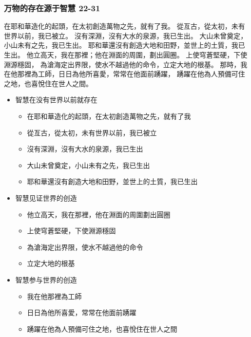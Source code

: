 \subsubsection{万物的存在源于智慧 22-31}
在耶和華造化的起頭，在太初創造萬物之先，就有了我。
從亙古，從太初，未有世界以前，我已被立。
沒有深淵，沒有大水的泉源，我已生出。
大山未曾奠定，小山未有之先，我已生出。
耶和華還沒有創造大地和田野，並世上的土質，我已生出。
他立高天，我在那裡；他在淵面的周圍，劃出圓圈。
上使穹蒼堅硬，下使淵源穩固，
為滄海定出界限，使水不越過他的命令，立定大地的根基。
那時，我在他那裡為工師，日日為他所喜愛，常常在他面前踴躍，
踴躍在他為人預備可住之地，也喜悅住在世人之間。
\begin{itemize}
\itemsep-.45em  
\item 智慧在没有世界以前就存在
\begin{itemize}
\itemsep-.45em
\item 在耶和華造化的起頭，在太初創造萬物之先，就有了我  
\item 從亙古，從太初，未有世界以前，我已被立
\item 沒有深淵，沒有大水的泉源，我已生出
\item 大山未曾奠定，小山未有之先，我已生出
\item 耶和華還沒有創造大地和田野，並世上的土質，我已生出
\end{itemize} 
\item 智慧见证世界的创造
\begin{itemize}
\itemsep-.45em  
\item 他立高天，我在那裡，他在淵面的周圍劃出圓圈
\item 上使穹蒼堅硬，下使淵源穩固
\item 為滄海定出界限，使水不越過他的命令
\item 立定大地的根基
\end{itemize} 
\item 智慧参与世界的创造
\begin{itemize}
\itemsep-.45em  
\item 我在他那裡為工師
\item 日日為他所喜愛，常常在他面前踴躍
\item 踴躍在他為人預備可住之地，也喜悅住在世人之間
\end{itemize}
\end{itemize}

